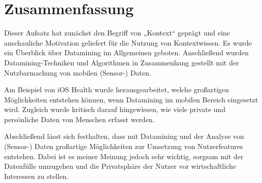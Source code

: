 \chapter{Zusammenfassung}

Dieser Aufsatz hat zunächst den Begriff von „Kontext“ geprägt und eine anschauliche Motivation geliefert für die Nutzung von Kontextwissen. Es wurde ein Überblick über Datamining im Allgemeinen geboten. Anschließend wurden Datamining-Techniken und Algorithmen in Zusammenhang gestellt mit der Nutzbarmachung von mobilen (Sensor-) Daten.

Am Beispiel von iOS Health wurde herausgearbeitet, welche großartigen Möglichkeiten entstehen können, wenn Datamining im mobilen Bereich eingesetzt wird. Zugleich wurde kritisch darauf hingewiesen, wie viele private und persönliche Daten von Menschen erfasst werden.

Abschließend lässt sich festhalten, dass mit Datamining und der Analyse von (Sensor-) Daten großartige Möglichkeiten zur Umsetzung von Nutzerfeatures entstehen. Dabei ist es meiner Meinung jedoch sehr wichtig, sorgsam mit der Datenfülle umzugehen und die Privatsphäre der Nutzer vor wirtschaftliche Interessen zu stellen.